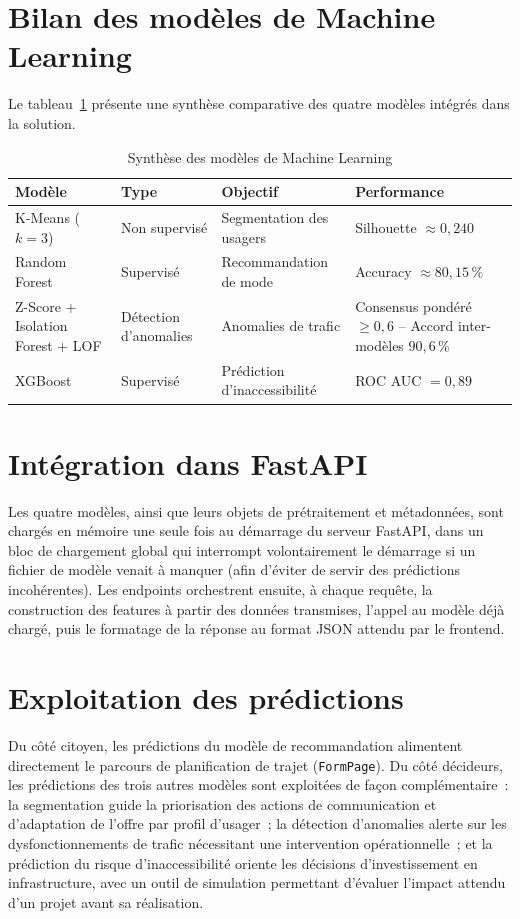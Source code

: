\section{Bilan des mod\`eles de Machine Learning}

Le tableau~\ref{tab:synthese_ml} pr\'esente une synth\`ese comparative des quatre mod\`eles int\'egr\'es dans la solution.

\begin{table}[H]
\centering
\caption{Synth\`ese des mod\`eles de Machine Learning}
\label{tab:synthese_ml}
\begin{tabular}{p{3.8cm}p{2.8cm}p{4cm}p{3.5cm}}
\toprule
\textbf{Mod\`ele} & \textbf{Type} & \textbf{Objectif} & \textbf{Performance} \\
\midrule
K-Means ($k=3$) & Non supervis\'e & Segmentation des usagers & Silhouette $\approx 0{,}240$ \\
Random Forest & Supervis\'e & Recommandation de mode & Accuracy $\approx 80{,}15\,\%$ \\
Z-Score + Isolation Forest + LOF & D\'etection d'anomalies & Anomalies de trafic & Consensus pond\'er\'e $\geq 0{,}6$ -- Accord inter-mod\`eles $90{,}6\,\%$ \\
XGBoost & Supervis\'e & Pr\'ediction d'inaccessibilit\'e & ROC AUC $= 0{,}89$ \\
\bottomrule
\end{tabular}
\end{table}

\section{Intégration dans FastAPI}
Les quatre modèles, ainsi que leurs objets de prétraitement et métadonnées, sont chargés en mémoire une seule fois au démarrage du serveur FastAPI, dans un bloc de chargement global qui interrompt volontairement le démarrage si un fichier de modèle venait à manquer (afin d'éviter de servir des prédictions incohérentes). Les endpoints orchestrent ensuite, à chaque requête, la construction des features à partir des données transmises, l'appel au modèle déjà chargé, puis le formatage de la réponse au format JSON attendu par le frontend.

\section{Exploitation des prédictions}
Du côté citoyen, les prédictions du modèle de recommandation alimentent directement le parcours de planification de trajet (\texttt{FormPage}). Du côté décideurs, les prédictions des trois autres modèles sont exploitées de façon complémentaire~: la segmentation guide la priorisation des actions de communication et d'adaptation de l'offre par profil d'usager~; la détection d'anomalies alerte sur les dysfonctionnements de trafic nécessitant une intervention opérationnelle~; et la prédiction du risque d'inaccessibilité oriente les décisions d'investissement en infrastructure, avec un outil de simulation permettant d'évaluer l'impact attendu d'un projet avant sa réalisation.

